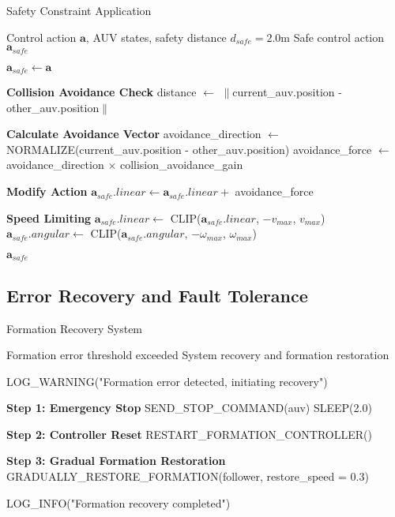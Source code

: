 \documentclass[11pt,a4paper]{article}
\newcommand{\vect}[1]{\boldsymbol{#1}}
\begin{document}
\begin{algorithm}[H]
\caption{Safety Constraint Application}
\label{alg:safety_extended}
\begin{algorithmic}[1]
\Require Control action $\vect{a}$, AUV states, safety distance $d_{safe} = 2.0$m
\Ensure Safe control action $\vect{a}_{safe}$

\State $\vect{a}_{safe} \leftarrow \vect{a}$

\State \textbf{Collision Avoidance Check}
    \State distance $\leftarrow$ $\|$current\_auv.position - other\_auv.position$\|$
    
        \State \textbf{Calculate Avoidance Vector}
        \State avoidance\_direction $\leftarrow$ NORMALIZE(current\_auv.position - other\_auv.position)
        \State avoidance\_force $\leftarrow$ avoidance\_direction $\times$ collision\_avoidance\_gain
        
        \State \textbf{Modify Action}
        \State $\vect{a}_{safe}.linear \leftarrow \vect{a}_{safe}.linear +$ avoidance\_force
    \EndIf
\EndFor

\State \textbf{Speed Limiting}
\State $\vect{a}_{safe}.linear \leftarrow$ CLIP($\vect{a}_{safe}.linear$, $-v_{max}$, $v_{max}$)
\State $\vect{a}_{safe}.angular \leftarrow$ CLIP($\vect{a}_{safe}.angular$, $-\omega_{max}$, $\omega_{max}$)

\Return $\vect{a}_{safe}$
\end{algorithmic}
\end{algorithm}

\subsection{Error Recovery and Fault Tolerance}

\begin{algorithm}[H]
\caption{Formation Recovery System}
\label{alg:recovery}
\begin{algorithmic}[1]
\Require Formation error threshold exceeded
\Ensure System recovery and formation restoration

\State LOG\_WARNING("Formation error detected, initiating recovery")

\State \textbf{Step 1: Emergency Stop}
    \State SEND\_STOP\_COMMAND(auv)
\EndFor
\State SLEEP(2.0) 

\State \textbf{Step 2: Controller Reset}
\State RESTART\_FORMATION\_CONTROLLER()

\State \textbf{Step 3: Gradual Formation Restoration}
    \State GRADUALLY\_RESTORE\_FORMATION(follower, restore\_speed = 0.3)
\EndFor

\State LOG\_INFO("Formation recovery completed")
\end{algorithmic}
\end{algorithm}
\end{document}
